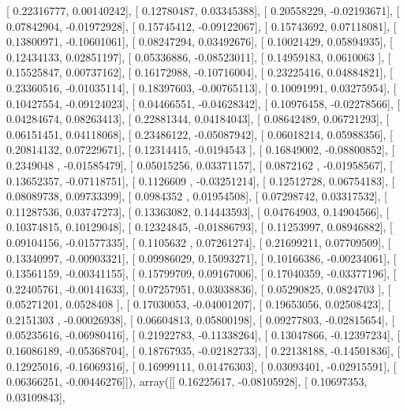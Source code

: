 \documentclass{article}
\begin{document}
       [ 0.22316777,  0.00140242],
       [ 0.12780487,  0.03345388],
       [ 0.20558229, -0.02193671],
       [ 0.07842904, -0.01972928],
       [ 0.15745412, -0.09122067],
       [ 0.15743692,  0.07118081],
       [ 0.13800971, -0.10601061],
       [ 0.08247294,  0.03492676],
       [ 0.10021429,  0.05894935],
       [ 0.12434133,  0.02851197],
       [ 0.05336886, -0.08523011],
       [ 0.14959183,  0.0610063 ],
       [ 0.15525847,  0.00737162],
       [ 0.16172988, -0.10716004],
       [ 0.23225416,  0.04884821],
       [ 0.23360516, -0.01035114],
       [ 0.18397603, -0.00765113],
       [ 0.10091991,  0.03275954],
       [ 0.10427554, -0.09124023],
       [ 0.04466551, -0.04628342],
       [ 0.10976458, -0.02278566],
       [ 0.04284674,  0.08263413],
       [ 0.22881344,  0.04184043],
       [ 0.08642489,  0.06721293],
       [ 0.06151451,  0.04118068],
       [ 0.23486122, -0.05087942],
       [ 0.06018214,  0.05988356],
       [ 0.20814132,  0.07229671],
       [ 0.12314415, -0.0194543 ],
       [ 0.16849002, -0.08800852],
       [ 0.2349048 , -0.01585479],
       [ 0.05015256,  0.03371157],
       [ 0.0872162 , -0.01958567],
       [ 0.13652357, -0.07118751],
       [ 0.1126609 , -0.03251214],
       [ 0.12512728,  0.06754183],
       [ 0.08089738,  0.09733399],
       [ 0.0984352 ,  0.01954508],
       [ 0.07298742,  0.03317532],
       [ 0.11287536,  0.03747273],
       [ 0.13363082,  0.14443593],
       [ 0.04764903,  0.14904566],
       [ 0.10374815,  0.10129048],
       [ 0.12324845, -0.01886793],
       [ 0.11253997,  0.08946882],
       [ 0.09104156, -0.01577335],
       [ 0.1105632 ,  0.07261274],
       [ 0.21699211,  0.07709509],
       [ 0.13340997, -0.00903321],
       [ 0.09986029,  0.15093271],
       [ 0.10166386, -0.00234061],
       [ 0.13561159, -0.00341155],
       [ 0.15799709,  0.09167006],
       [ 0.17040359, -0.03377196],
       [ 0.22405761, -0.00141633],
       [ 0.07257951,  0.03038836],
       [ 0.05290825,  0.0824703 ],
       [ 0.05271201,  0.0528408 ],
       [ 0.17030053, -0.04001207],
       [ 0.19653056,  0.02508423],
       [ 0.2151303 , -0.00026938],
       [ 0.06604813,  0.05800198],
       [ 0.09277803, -0.02815654],
       [ 0.05235616, -0.06980416],
       [ 0.21922783, -0.11338264],
       [ 0.13047866, -0.12397234],
       [ 0.16086189, -0.05368704],
       [ 0.18767935, -0.02182733],
       [ 0.22138188, -0.14501836],
       [ 0.12925016, -0.16069316],
       [ 0.16999111,  0.01476303],
       [ 0.03093401, -0.02915591],
       [ 0.06366251, -0.00446276]]), array([[ 0.16225617, -0.08105928],
       [ 0.10697353,  0.03109843],
\end{document}

